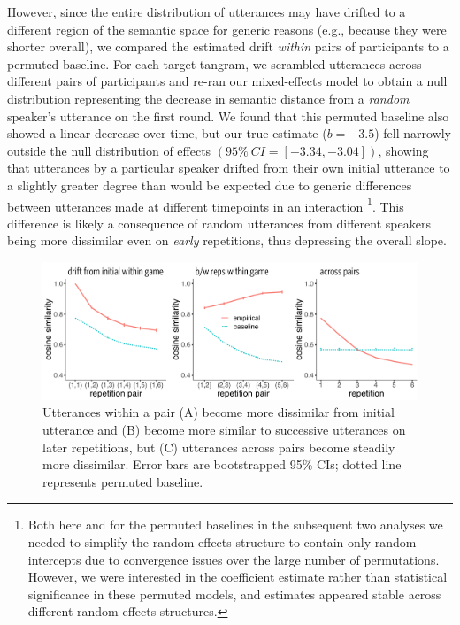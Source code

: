 \documentclass[alpha-refs]{wiley-article}
\begin{document}
However, since the entire distribution of utterances may have drifted to a different region of the semantic space for generic reasons (e.g., because they were shorter overall), we compared the estimated drift \emph{within} pairs of participants to a permuted baseline.
For each target tangram, we scrambled utterances across different pairs of participants and re-ran our mixed-effects model to obtain a null distribution representing the decrease in semantic distance from a \emph{random} speaker's utterance on the first round.
We found that this permuted baseline also showed a linear decrease over time, but our true estimate ($b=-3.5$) fell narrowly outside the null distribution of effects $(95\%~CI= [-3.34, -3.04])$, showing that utterances by a particular speaker drifted from their own initial utterance to a slightly greater degree than would be expected due to generic differences between utterances made at different timepoints in an interaction \footnote{Both here and for the permuted baselines in the subsequent two analyses we needed to simplify the random effects structure to contain only random intercepts due to convergence issues over the large number of permutations. However, we were interested in the coefficient estimate rather than statistical significance in these permuted models, and estimates appeared stable across different random effects structures.}.
This difference is likely a consequence of random utterances from different speakers being more dissimilar even on \emph{early} repetitions, thus depressing the overall slope.

\begin{figure}
\includegraphics[scale=.52]{similarity_analysis.pdf}
\caption{Utterances within a pair (A) become more dissimilar from initial utterance and (B) become more similar to successive utterances on later repetitions, but (C) utterances across pairs become steadily more dissimilar. Error bars are bootstrapped 95\% CIs; dotted line represents permuted baseline.}
\label{fig:similarity}
\end{figure}
\end{document}
